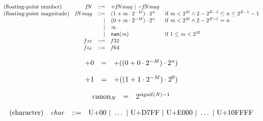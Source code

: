$$
\begin{array}{@{}lrrl@{}l@{}}
\mbox{(floating-point number)} & {{\mathit{f}}}{{\mathit{N}}} &::=& {+{{{\mathit{f}}}{{\mathit{N}}}}{{\mathit{mag}}}} ~|~ {-{{{\mathit{f}}}{{\mathit{N}}}}{{\mathit{mag}}}} \\
\mbox{(floating-point magnitude)} & {{{\mathit{f}}}{{\mathit{N}}}}{{\mathit{mag}}} &::=& (1 + {\mathit{m}} \cdot {2^{{-{\mathit{M}}}}}) \cdot {2^{{\mathit{n}}}} &\quad
  \mbox{if}~{\mathit{m}} < {2^{{\mathit{M}}}} \land 2 - {2^{{\mathit{E}} - 1}} \leq {\mathit{n}} \leq {2^{{\mathit{E}} - 1}} - 1 \\ &&|&
(0 + {\mathit{m}} \cdot {2^{{-{\mathit{M}}}}}) \cdot {2^{{\mathit{n}}}} &\quad
  \mbox{if}~{\mathit{m}} < {2^{{\mathit{M}}}} \land 2 - {2^{{\mathit{E}} - 1}} = {\mathit{n}} \\ &&|&
\infty \\ &&|&
{\mathsf{nan}}{({\mathit{m}})} &\quad
  \mbox{if}~1 \leq {\mathit{m}} < {2^{{\mathit{M}}}} \\
& {\mathit{f{\scriptstyle32}}} &::=& {{\mathit{f}}}{32} \\
& {\mathit{f{\scriptstyle64}}} &::=& {{\mathit{f}}}{64} \\
\end{array}
$$

$$
\begin{array}{@{}lcl@{}l@{}}
{+0} &=& {+((0 + 0 \cdot {2^{{-{\mathit{M}}}}}) \cdot {2^{{\mathit{n}}}})} &  \\
\end{array}
$$

$$
\begin{array}{@{}lcl@{}l@{}}
{+1} &=& {+((1 + 1 \cdot {2^{{-{\mathit{M}}}}}) \cdot {2^{0}})} &  \\
\end{array}
$$

$$
\begin{array}{@{}lcl@{}l@{}}
{{\mathrm{canon}}}_{{\mathit{N}}} &=& {2^{{\mathrm{signif}}({\mathit{N}}) - 1}} &  \\
\end{array}
$$

\vspace{1ex}

$$
\begin{array}{@{}lrrl@{}l@{}}
\mbox{(character)} & {\mathit{char}} &::=& \mathrm{U{+}00} ~|~ \dots ~|~ \mathrm{U{+}D7FF} ~|~ \mathrm{U{+}E000} ~|~ \dots ~|~ \mathrm{U{+}10FFFF} \\
\end{array}
$$

